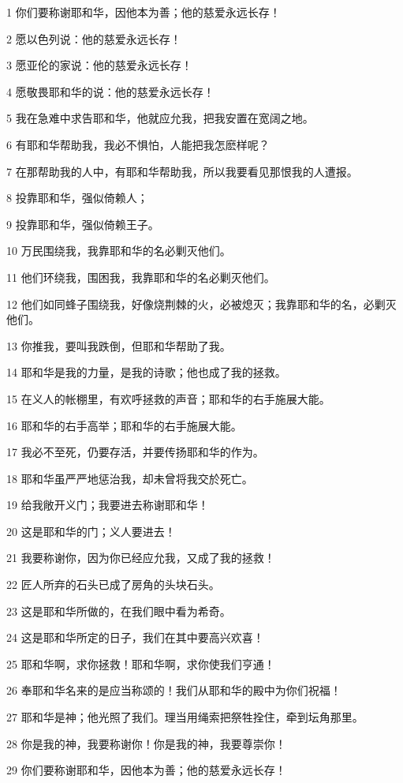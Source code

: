 \par 1 你们要称谢耶和华，因他本为善；他的慈爱永远长存！
\par 2 愿以色列说：他的慈爱永远长存！
\par 3 愿亚伦的家说：他的慈爱永远长存！
\par 4 愿敬畏耶和华的说：他的慈爱永远长存！
\par 5 我在急难中求告耶和华，他就应允我，把我安置在宽阔之地。
\par 6 有耶和华帮助我，我必不惧怕，人能把我怎麽样呢？
\par 7 在那帮助我的人中，有耶和华帮助我，所以我要看见那恨我的人遭报。
\par 8 投靠耶和华，强似倚赖人；
\par 9 投靠耶和华，强似倚赖王子。
\par 10 万民围绕我，我靠耶和华的名必剿灭他们。
\par 11 他们环绕我，围困我，我靠耶和华的名必剿灭他们。
\par 12 他们如同蜂子围绕我，好像烧荆棘的火，必被熄灭；我靠耶和华的名，必剿灭他们。
\par 13 你推我，要叫我跌倒，但耶和华帮助了我。
\par 14 耶和华是我的力量，是我的诗歌；他也成了我的拯救。
\par 15 在义人的帐棚里，有欢呼拯救的声音；耶和华的右手施展大能。
\par 16 耶和华的右手高举；耶和华的右手施展大能。
\par 17 我必不至死，仍要存活，并要传扬耶和华的作为。
\par 18 耶和华虽严严地惩治我，却未曾将我交於死亡。
\par 19 给我敞开义门；我要进去称谢耶和华！
\par 20 这是耶和华的门；义人要进去！
\par 21 我要称谢你，因为你已经应允我，又成了我的拯救！
\par 22 匠人所弃的石头已成了房角的头块石头。
\par 23 这是耶和华所做的，在我们眼中看为希奇。
\par 24 这是耶和华所定的日子，我们在其中要高兴欢喜！
\par 25 耶和华啊，求你拯救！耶和华啊，求你使我们亨通！
\par 26 奉耶和华名来的是应当称颂的！我们从耶和华的殿中为你们祝福！
\par 27 耶和华是神；他光照了我们。理当用绳索把祭牲拴住，牵到坛角那里。
\par 28 你是我的神，我要称谢你！你是我的神，我要尊崇你！
\par 29 你们要称谢耶和华，因他本为善；他的慈爱永远长存！

